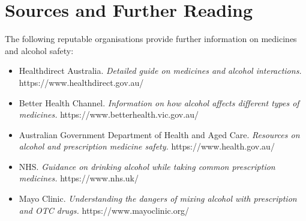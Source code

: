 \section*{Sources and Further Reading}
The following reputable organisations provide further information on medicines and alcohol safety:
\begin{itemize}
    \item Healthdirect Australia. \textit{Detailed guide on medicines and alcohol interactions.} https://www.healthdirect.gov.au/
    \item Better Health Channel. \textit{Information on how alcohol affects different types of medicines.} https://www.betterhealth.vic.gov.au/
    \item Australian Government Department of Health and Aged Care. \textit{Resources on alcohol and prescription medicine safety.} https://www.health.gov.au/
    \item NHS. \textit{Guidance on drinking alcohol while taking common prescription medicines.} https://www.nhs.uk/
    \item Mayo Clinic. \textit{Understanding the dangers of mixing alcohol with prescription and OTC drugs.} https://www.mayoclinic.org/
\end{itemize}
